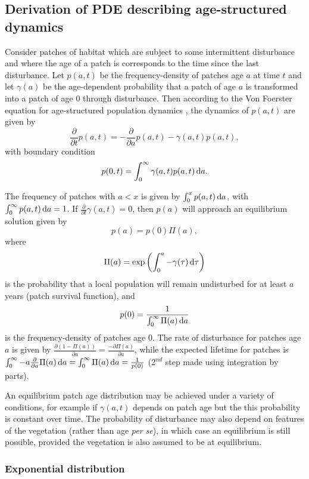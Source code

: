 \documentclass[10pt,twoside]{article}
\begin{document}
\subsection{Derivation of PDE describing age-structured
dynamics}\label{derivation-of-pde-describing-age-structured-dynamics}

Consider patches of habitat which are subject to some intermittent
disturbance and where the age of a patch is corresponds to the time
since the last disturbance. Let \(p(a,t)\) be the frequency-density of
patches age \(a\) at time \(t\) and let \(\gamma(a)\) be the
age-dependent probability that a patch of age \(a\) is transformed into
a patch of age \(0\) through disturbance. Then according to the Von
Foerster equation for age-structured population dynamics
\citep{Vonfoerster-1959}, the dynamics of \(p(a,t)\) are given by
\[ \frac{\partial }{\partial t} p(a,t)=-\frac{\partial }{\partial a} p(a,t)-\gamma(a,t)p(a,t),\]
with boundary condition
\[ p(0,t)=\int^{\infty}_{0}\gamma(a,t)p(a,t)\,{\rm d}a.\]

The frequency of patches with \(a < x\) is given by
\(\int_{0}^{x}p(a,t) \, {\rm d}a\), with
\(\int_{0}^{\infty} p(a,t) \, {\rm d}a =1\). If
\(\frac{\partial}{\partial t}\gamma(a,t)=0\), then \(p(a)\) will
approach an equilibrium solution given by \[p(a) = p(0) \Pi(a),\] where
\[\Pi(a) = \exp \left( \int_{0}^{a}-\gamma(\tau)\,{\rm d}\tau\right)\]
is the probability that a local population will remain undisturbed for
at least \(a\) years (patch survival function), and
\[p(0) = \frac1{ \int_{0}^{\infty}\Pi(a) \,{\rm d}a}\] is the
frequency-density of patches age 0. The rate of disturbance for patches
age \(a\) is given by
\(\frac{\partial (1-\Pi(a))}{\partial a} = \frac{-\partial \Pi(a)}{\partial a}\),
while the expected lifetime for patches is
\(\int_0^\infty - a \frac{\partial}{\partial a} \Pi(a) \, {\rm d} a = \int_0^\infty \Pi(a) \, {\rm d} a = \frac1{p(0)}\)
(2\(^{nd}\) step made using integration by parts).

An equilibrium patch age distribution may be achieved under a variety of
conditions, for example if \(\gamma(a,t)\) depends on patch age but the
this probability is constant over time. The probability of disturbance
may also depend on features of the vegetation (rather than age \emph{per
se}), in which case an equilibrium is still possible, provided the
vegetation is also assumed to be at equilibrium.

\subsubsection{Exponential distribution}\label{exponential-distribution}
\end{document}
